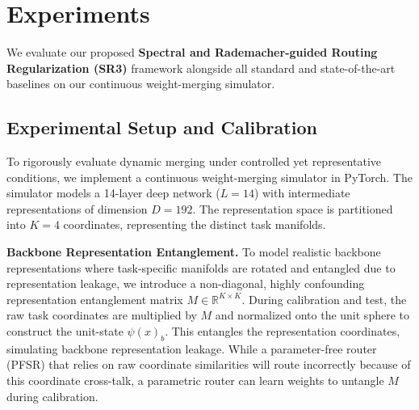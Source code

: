 \section{Experiments}
\label{sec:experiments}

We evaluate our proposed \textbf{Spectral and Rademacher-guided Routing Regularization (SR3)} framework alongside all standard and state-of-the-art baselines on our continuous weight-merging simulator.

\subsection{Experimental Setup and Calibration}
To rigorously evaluate dynamic merging under controlled yet representative conditions, we implement a continuous weight-merging simulator in PyTorch. The simulator models a 14-layer deep network ($L=14$) with intermediate representations of dimension $D=192$. The representation space is partitioned into $K=4$ coordinates, representing the distinct task manifolds.

\textbf{Backbone Representation Entanglement.} To model realistic backbone representations where task-specific manifolds are rotated and entangled due to representation leakage, we introduce a non-diagonal, highly confounding representation entanglement matrix $M \in \mathbb{R}^{K \times K}$. During calibration and test, the raw task coordinates are multiplied by $M$ and normalized onto the unit sphere to construct the unit-state $\psi(x)_b$. This entangles the representation coordinates, simulating backbone representation leakage. While a parameter-free router (PFSR) that relies on raw coordinate similarities will route incorrectly because of this coordinate cross-talk, a parametric router can learn weights to untangle $M$ during calibration.

